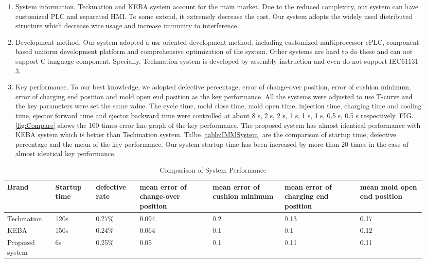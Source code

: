 \documentclass[journal,UTF8]{IEEEtran}
\begin{document}
\begin{enumerate}
	\item System information. Teckmation and KEBA system account for the main market. Due to the reduced complexity, our system can have customized PLC and separated HMI. To some extend, it extremely decrease the cost. Our system adopts the widely used distributed structure which decrease wire usage and increase immunity to interference.
	\item Development method. Our system adopted a usr-oriented development method, including customized multiprocessor ePLC, component based uniform development platform and comprehensive optimization of the system. Other systems are hard to do these and can not support C language component. Specially, Techmation system is developed by assembly instruction and even do not support IEC61131-3.
	\item Key performance. To our best knowledge, we adopted defective percentage, error of change-over position, error of cushion minimum, error of charging end position and mold open end position as the key performance. All the systems were adjusted to use T-curve and the key parameters were set the same value. The cycle time, mold close time, mold open time, injection time, charging time and cooling time, ejector forward time and ejector backward time were controlled at about 8 s, 2 s, 2 s, 1 s, 1 s, 1 s, 0.5 s, 0.5 s respectively. FIG. \ref{fig:Compare} shows the 100 times error line graph of the key performance. The proposed system has almost identical performance with KEBA system which is better than Techmation system. Talbe \ref{table:IMMSystem} are the comparison of startup time, defective percentage and the mean of the key performance. Our system startup time has been increased by more than 20 times in the case of almost identical key performance.
\end{enumerate}
\begin{table}
	\scriptsize \caption{Comparison of System Performance}
	\label{table:ComparisonG}
	\begin{center}
		\renewcommand{\arraystretch}{1.4}
		\setlength\tabcolsep{3pt}
		\begin{tabular}{|p{2cm}|p{1.5cm}|p{1.5cm}|p{2.3cm}|p{2.3cm}|p{2.3cm}|p{2cm}|}
			\hline
			Brand & Startup time &defective rate&mean error of change-over position&mean error of cushion minimum&mean error of charging end position&mean mold open end position\\
			\hline
			Techmation  & 120s  &0.27\% &0.094 & 0.2 & 0.13 & 0.17 \\
			\hline
			KEBA        & 150s  &0.24\% &0.064 & 0.1 & 0.1 & 0.12 \\
			\hline
			Proposed system   & 6s     &0.25\% &0.05 & 0.1 & 0.11 & 0.11\\
			\hline
		\end{tabular}
	\end{center}
\end{table}
\end{document}
